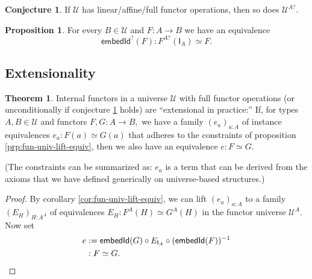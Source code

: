 \documentclass[a4paper]{article}
\theoremstyle{definition}
\newtheorem{theorem}[definition]{Theorem}
\newtheorem{proposition}[definition]{Proposition}
\newtheorem{conjecture}[definition]{Conjecture}
\theoremstyle{remark}
\renewcommand{\equiv}{\simeq}
\newcommand{\U}{\mathcal{U}}
\newcommand{\nm}{\mathsf}
\newcommand{\combinator}{\nm}
\newcommand{\idFun}{\combinator{I}}
\begin{document}
\begin{conjecture}
  \label{conj:fun-univ-linear}
  If $\U$ has linear/affine/full functor operations, then so does $\U^{A?}.$
\end{conjecture}

\begin{proposition}
  For every $B \in \U$ and $F : A \to B$ we have an equivalence
  \[\nm{embedId}^?(F) : F^{A?}(\idFun_A) \equiv F.\]
\end{proposition}

\subsection{Extensionality}
\label{sec:extensionality}

\begin{theorem}
  \label{thm:extensionality}
  Internal functors in a universe $\U$ with full functor operations (or unconditionally
  if conjecture \ref{conj:fun-univ-linear} holds) are ``extensional in practice:''
  If, for types $A,B \in \U$ and functors $F,G : A \to B,$ we have a family
  $(e_a)_{a : A}$ of instance equivalences $e_a : F(a) \equiv G(a)$ that adheres to the
  constraints of proposition \ref{prp:fun-univ-lift-equiv}, then we also have an
  equivalence $e : F \equiv G.$
\end{theorem}

(The constraints can be summarized as: $e_a$ is a term that can be derived from the
axioms that we have defined generically on universe-based structures.)

\begin{proof}
  By corollary \ref{cor:fun-univ-lift-equiv}, we can lift $(e_a)_{a : A}$ to a
  family $(E_H)_{H : A^A}$ of equivalences $E_H : F^A(H) \equiv G^A(H)$ in the
  functor universe $\U^A.$ Now set
  \begin{align*}
    e &:= \nm{embedId}(G) \circ E_{\idFun_A} \circ (\nm{embedId}(F))^{-1}\\
      &: F \equiv G. \qedhere
  \end{align*}
\end{proof}
\end{document}
